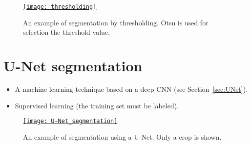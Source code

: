 \begin{figure}[H]
  \vspace{1ex}
  \centering
\href{https://github.com/vicente-gonzalez-ruiz/medical_imaging/blob/main/notebooks/thresholding.ipynb}{\texttt{[image: thresholding]}}
  \caption[An example of segmentation by thresholding.]{An example of
    segmentation by thresholding. Otsu is used for selection the
    threshold value.}
  \label{fig:thresholding}
\end{figure}

\section{U-Net segmentation \cite{ronneberger2015u}}

\begin{itemize}
\item A machine learning technique based on a deep \gls{CNN} (see Section~\ref{sec:UNet}).
\item Supervised learning (the training set must be labeled).
\end{itemize}



\begin{figure}[H]
  \vspace{1ex}
  \centering
\href{https://github.com/vicente-gonzalez-ruiz/medical_imaging/blob/main/notebooks/unet_cell_data.ipynb}{\texttt{[image: U-Net\_segmentation]}}
  \caption[An example of segmentation using a U-Net.]{An example of
    segmentation using a U-Net. Only a crop is shown.}
  \label{fig:U-Net_segmentatin}
\end{figure}

